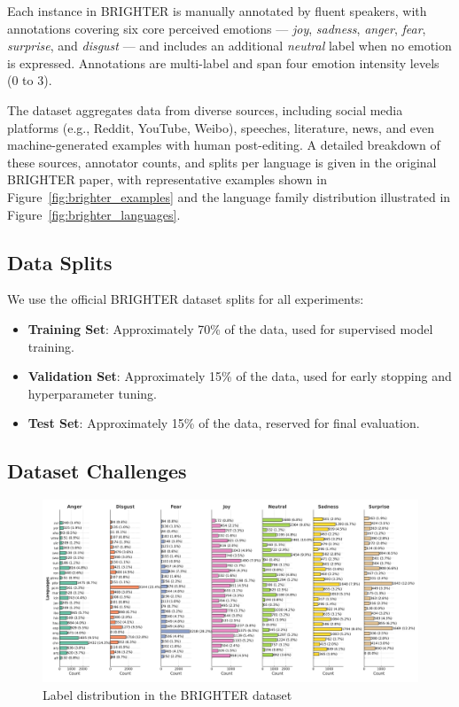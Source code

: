 \documentclass[a4paper,12pt]{extarticle}
\begin{document}
Each instance in BRIGHTER is manually annotated by fluent speakers, with annotations covering six core perceived emotions — \textit{joy}, \textit{sadness}, \textit{anger}, \textit{fear}, \textit{surprise}, and \textit{disgust} — and includes an additional \textit{neutral} label when no emotion is expressed. Annotations are multi-label and span four emotion intensity levels (0 to 3).

The dataset aggregates data from diverse sources, including social media platforms (e.g., Reddit, YouTube, Weibo), speeches, literature, news, and even machine-generated examples with human post-editing. A detailed breakdown of these sources, annotator counts, and splits per language is given in the original BRIGHTER paper, with representative examples shown in Figure~\ref{fig:brighter_examples} and the language family distribution illustrated in Figure~\ref{fig:brighter_languages}.

\subsection{Data Splits}
We use the official BRIGHTER dataset splits for all experiments:

\begin{itemize}
\item \textbf{Training Set}: Approximately 70\% of the data, used for supervised model training.
\item \textbf{Validation Set}: Approximately 15\% of the data, used for early stopping and hyperparameter tuning.
\item \textbf{Test Set}: Approximately 15\% of the data, reserved for final evaluation.
\end{itemize}

\subsection{Dataset Challenges}

\begin{figure}[h]
    \centering
    \includegraphics[width=1\textwidth]{brighter_label_distribution.png}
    \caption{Label distribution in the BRIGHTER dataset}
    \label{fig:brighter_label_distribution}
\end{figure}
\end{document}
